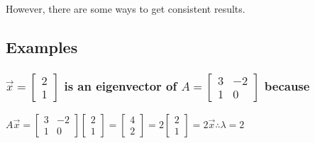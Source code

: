 \documentclass[
  letterpaper,
  DIV=11,
  numbers=noendperiod]{scrartcl}
\begin{document}
However, there are some ways to get consistent results.

\hypertarget{examples-2}{%
\subsection{Examples}\label{examples-2}}

\hypertarget{vecx-beginbmatrix2-1-endbmatrix-is-an-eigenvector-of-a-beginbmatrix3--2-1-0endbmatrix-because}{%
\subsubsection{\texorpdfstring{\(\vec{x} = \begin{bmatrix}2 \\ 1 \end{bmatrix}\)
is an eigenvector of \(A = \begin{bmatrix}3 & -2 \\ 1 & 0\end{bmatrix}\)
because}{\textbackslash vec\{x\} = \textbackslash begin\{bmatrix\}2 \textbackslash\textbackslash{} 1 \textbackslash end\{bmatrix\} is an eigenvector of A = \textbackslash begin\{bmatrix\}3 \& -2 \textbackslash\textbackslash{} 1 \& 0\textbackslash end\{bmatrix\} because}}\label{vecx-beginbmatrix2-1-endbmatrix-is-an-eigenvector-of-a-beginbmatrix3--2-1-0endbmatrix-because}}

\(A\vec{x} = \begin{bmatrix}3 & -2 \\ 1 & 0\end{bmatrix}\begin{bmatrix}2 \\ 1\end{bmatrix} = \begin{bmatrix}4 \\ 2\end{bmatrix} = 2\begin{bmatrix}2 \\ 1\end{bmatrix} = 2\vec{x} \therefore \lambda = 2\)
\end{document}

